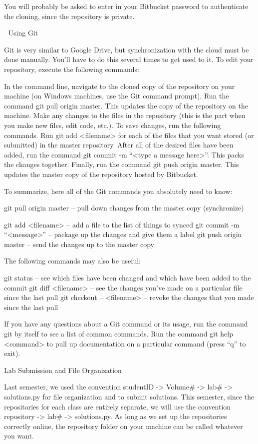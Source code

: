 You will probably be asked to enter in your Bitbucket password to authenticate the cloning, since the repository is private.


Using Git

Git is very similar to Google Drive, but synchronization with the cloud must be done manually. You'll have to do this several times to get used to it. To edit your repository, execute the following commands:

In the command line, navigate to the cloned copy of the repository on your machine (on Windows machines, use the Git command prompt).
Run the command git pull origin master. This updates the copy of the repository on the machine.
Make any changes to the files in the repository (this is the part when you make new files, edit code, etc.).
To save changes, run the following commands.
Run git add <filename> for each of the files that you want stored (or submitted) in the master repository.
After all of the desired files have been added, run the command git commit -m “<type a message here>”. This packs the changes together.
Finally, run the command git push origin master. This updates the master copy of the repository hosted by Bitbucket.

To summarize, here all of the Git commands you absolutely need to know:

git pull origin master    – pull down changes from the master copy (synchronize)

git add <filename>      – add a file to the list of things to synced
git commit -m “<message>”   – package up the changes and give them a label
git push origin master    – send the changes up to the master copy

The following commands may also be useful:

git status        – see which files have been changed and which have been
   added to the commit
git diff <filename>       – see the changes you've made on a particular file since
   the last pull
git checkout -- <filename>    – revoke the changes that you made since the last pull

If you have any questions about a Git command or its usage, run the command git by itself to see a list of common commands. Run the command git help <command> to pull up documentation on a particular command (press “q” to exit).


Lab Submission and File Organization

Last semester, we used the convention studentID -> Volume\# -> lab\# -> solutions.py for file organization and to submit solutions. This semester, since the repositories for each class are entirely separate, we will use the convention repository -> lab\# -> solutions.py. As long as we set up the repositories correctly online, the repository folder on your machine can be called whatever you want.

